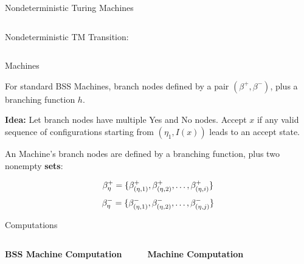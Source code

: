 \documentclass[c]{beamer}
\begin{document}
\begin{frame}{Nondeterministic Turing Machines}

  \begin{columns}

    Nondeterministic TM Transition:
       

    \begin{center}
      \scaletopagewidth{\ndetercomptm{}}
    \end{center}
  \end{columns}
\end{frame}

\begin{frame}{\ndet Machines}

  For standard BSS Machines, branch nodes defined by a pair
  $(\beta^+, \beta^-)$, plus a branching function $h$.\pause

  \vspace{\baselineskip}

  \textbf{Idea:} Let branch nodes have multiple Yes and No nodes.
  Accept $x$ if any valid sequence of configurations starting from
  $(\eta_1, I(x))$ leads to an accept state.\pause
  
  \vspace{\baselineskip}

  An \ndet Machine's branch nodes are defined by a branching function,
  plus two nonempty \textbf{sets}:

  $$\beta^+_\eta = \{\beta_{(\eta, 1)}^+, \beta_{(\eta, 2)}^+, \ldots, \beta_{(\eta, i)}^+\}$$
  $$\beta_\eta^- = \{\beta_{(\eta, 1)}^-, \beta_{(\eta, 2)}^-, \ldots, \beta_{(\eta, j)}^-\}$$
\end{frame}

\begin{frame}{\ndet Computations}
  
  \begin{columns}
    
    \textbf{BSS Machine Computation}
    \begin{center}
      \detercompbss{}
    \end{center}
    \textbf{\ndet Machine Computation}
    \begin{center}
      \scaletopagewidth{\ndetercompbss{}}
    \end{center}
  \end{columns}

\end{frame}
\end{document}
